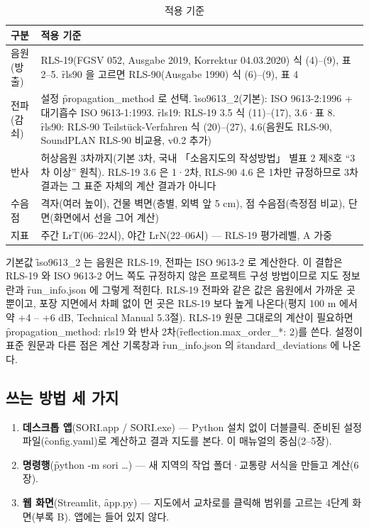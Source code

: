 \documentclass[10.5pt,a4paper]{article}
\begin{document}
\begin{table}[h]\centering\small
\caption{적용 기준}\label{tab:std}
\begin{tabularx}{\textwidth}{P{24mm}L}
\toprule
구분 & 적용 기준 \\ \midrule
음원(방출) & RLS-19(FGSV 052, Ausgabe 2019, Korrektur 04.03.2020) 식 (4)–(9), 표 2–5. \f{rls90} 을 고르면 RLS-90(Ausgabe 1990) 식 (6)–(9), 표 4 \\
전파(감쇠) & 설정 \f{propagation\_method} 로 선택. \f{iso9613\_2}(기본): ISO 9613-2:1996 + 대기흡수 ISO 9613-1:1993. \f{rls19}: RLS-19 3.5 식 (11)–(17), 3.6·표 8. \f{rls90}: RLS-90 Teilstück-Verfahren 식 (20)–(27), 4.6(음원도 RLS-90, SoundPLAN RLS-90 비교용, v0.2 추가) \\
반사 & 허상음원 3차까지(기본 3차, 국내 「소음지도의 작성방법」 별표 2 제8호 ``3차 이상'' 원칙). RLS-19 3.6 은 1·2차, RLS-90 4.6 은 1차만 규정하므로 3차 결과는 그 표준 자체의 계산 결과가 아니다 \\
수음점 & 격자(여러 높이), 건물 벽면(층별, 외벽 앞 5 cm), 점 수음점(측정점 비교), 단면(화면에서 선을 그어 계산) \\
지표 & 주간 LrT(06–22시), 야간 LrN(22–06시) — RLS-19 평가레벨, A 가중 \\
\bottomrule
\end{tabularx}
\end{table}

 기본값 \f{iso9613\_2} 는 음원은 RLS-19, 전파는 ISO 9613-2 로 계산한다. 이 결합은 RLS-19 와 ISO 9613-2 어느 쪽도 규정하지 않은 프로젝트 구성 방법이므로 지도 정보란과 \f{run\_info.json} 에 그렇게 적힌다. RLS-19 전파와 같은 값은 음원에서 가까운 곳뿐이고, 포장 지면에서 차폐 없이 먼 곳은 RLS-19 보다 높게 나온다(평지 100 m 에서 약 +4 – +6 dB, Technical Manual 5.3절). RLS-19 원문 그대로의 계산이 필요하면 \f{propagation\_method: rls19} 와 반사 2차(\f{reflection.max\_order\_*: 2})를 쓴다. 설정이 표준 원문과 다른 점은 계산 기록창과 \f{run\_info.json} 의 \f{standard\_deviations} 에 나온다.

\subsection{쓰는 방법 세 가지}
\begin{enumerate}
\item \textbf{데스크톱 앱}(\f{SORI.app} / \f{SORI.exe}) — Python 설치 없이 더블클릭. 준비된 설정 파일(\f{config.yaml})로 계산하고 결과 지도를 본다. 이 매뉴얼의 중심(2–5장).
\item \textbf{명령행}(\f{python -m sori …}) — 새 지역의 작업 폴더·교통량 서식을 만들고 계산(6장).
\item \textbf{웹 화면}(Streamlit, \f{app.py}) — 지도에서 교차로를 클릭해 범위를 고르는 4단계 화면(부록 B). 앱에는 들어 있지 않다.
\end{enumerate}
\end{document}

